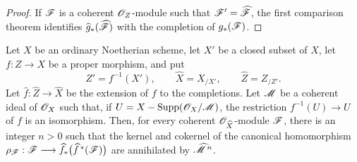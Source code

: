 \begin{proof}
If $\mathscr{F}$ is a coherent $\mathscr{O}_Z$-module such that
$\mathscr{F}'=\widehat{\mathscr{F}}$, the first comparison theorem
 identifies
$\widehat{g}_*(\widehat{\mathscr{F}})$ with the completion of
$g_*(\mathscr{F})$.
\end{proof}

\begin{lemma}[5.3.4]
\label{III.5.3.4}
Let $X$ be an ordinary Noetherian scheme, let $X'$ be a closed
subset of $X$, let $f:Z\to X$ be a proper morphism, and put
\[
  Z'=f^{-1}(X'),\qquad
  \widehat{X}=X_{/X'},\qquad
  \widehat{Z}=Z_{/Z'}.
\]
Let $\widehat{f}:\widehat{Z}\to\widehat{X}$ be the extension of $f$
to the completions.  Let $\mathscr{M}$ be a coherent ideal of
$\mathscr{O}_X$ such that, if $U=X-\operatorname{Supp}(\mathscr{O}_X/\mathscr{M})$,
the restriction $f^{-1}(U)\to U$ of $f$ is an isomorphism.  Then,
for every coherent $\mathscr{O}_{\widehat{X}}$-module $\mathscr{F}$, there is
an integer $n>0$ such that the kernel and cokernel of the canonical
homomorphism $\rho_{\mathscr{F}}:
\mathscr{F}\longrightarrow
\widehat{f}_*\bigl(\widehat{f}^{\,*}(\mathscr{F})\bigr)$
 are annihilated by
$\widehat{\mathscr{M}}^{\,n}$.
\end{lemma}

